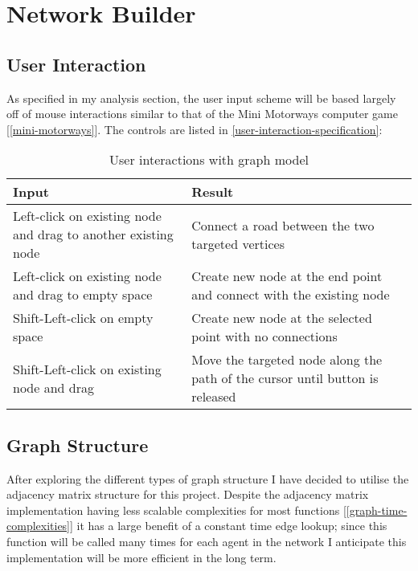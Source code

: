 \section{Network Builder}

    \subsection{User Interaction}

    As specified in my analysis section, the user input scheme will be based largely off of mouse interactions similar to that of the Mini Motorways computer game [\autoref{mini-motorways}]. The controls are listed in \autoref{user-interaction-specification}:

    \begin{table}[ht]
        \centering
        \begin{tabular}{|p{}|p{}|}
            \hline
            \textbf{Input} & \textbf{Result}\\
            \hline
            Left-click on existing node and drag to another existing node & Connect a road between the two targeted vertices\\\hline
            Left-click on existing node and drag to empty space & Create new node at the end point and connect with the existing node\\\hline
            Shift-Left-click on empty space & Create new node at the selected point with no connections\\\hline
            Shift-Left-click on existing node and drag & Move the targeted node along the path of the cursor until button is released\\\hline
        \end{tabular}
        \caption{User interactions with graph model}
        \label{user-interaction-specification}
    \end{table}

    \subsection{Graph Structure}

        After exploring the different types of graph structure I have decided to utilise the adjacency matrix structure for this project. Despite the adjacency matrix implementation having less scalable complexities for most functions [\autoref{graph-time-complexities}] it has a large benefit of a constant time edge lookup; since this function will be called many times for each agent in the network I anticipate this implementation will be more efficient in the long term.

